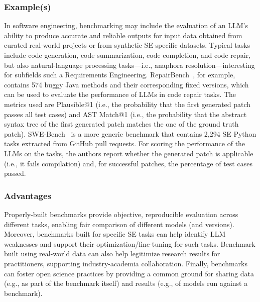\subsubsection{Example(s)}

In software engineering, benchmarking may include the evaluation of an LLM's ability to produce accurate and reliable outputs for input data obtained from curated real-world projects or from synthetic SE-specific datasets.
Typical tasks include code generation, code summarization, code completion, and code repair, but also natural-language processing tasks---i.e., anaphora resolution---interesting for subfields such a Requirements Engineering. 
RepairBench~\cite{silva2024repairbench}, for example, contains 574 buggy Java methods and their corresponding fixed versions, which can be used to evaluate the performance of LLMs in code repair tasks.
The metrics used are Plausible@1 (i.e., the probability that the first generated patch passes all test cases) and AST Match@1 (i.e., the probability that the abstract syntax tree of the first generated patch matches the one of the ground truth patch).
SWE-Bench~\cite{DBLP:conf/iclr/JimenezYWYPPN24} is a more generic benchmark that contains 2,294 SE Python tasks extracted from GitHub pull requests.
For scoring the performance of the LLMs on the tasks, the authors report whether the generated patch is applicable (i.e., it fails compilation) and, for successful patches, the percentage of test cases passed.

\subsubsection{Advantages}

Properly-built benchmarks provide objective, reproducible evaluation across different tasks, enabling fair comparison of different models (and versions).
Moreover, benchmarks built for specific SE tasks can help identify LLM weaknesses and support their optimization/fine-tuning for such tasks.
Benchmark built using real-world data can also help legitimize research results for practitioners, supporting industry-academia collaboration.
Finally, benchmarks can foster open science practices by providing a common ground for sharing data (e.g., as part of the benchmark itself) and results (e.g., of models run against a benchmark).

